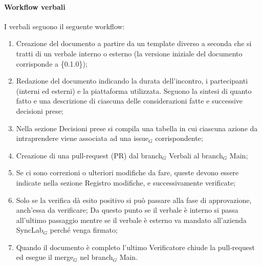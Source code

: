 \documentclass[10pt]{article}
\begin{document}
\begin{justify}
        \paragraph{Workflow verbali}
        I verbali seguono il seguente workflow:
        \begin{enumerate}
            \item Creazione del documento a partire da un template diverso a seconda che si tratti di un verbale interno o esterno (la versione iniziale del documento corrisponde a \{0.1.0\});
            \item Redazione del documento indicando la durata dell'incontro, i partecipanti (interni ed esterni) e la piattaforma utilizzata. Seguono la sintesi di quanto fatto e una descrizione di ciascuna delle considerazioni fatte e successive decisioni prese;
            \item Nella sezione Decisioni prese si compila una
            tabella in cui ciascuna azione da intraprendere viene associata ad una issue$_G$ corrispondente;
            \item Creazione di una pull-request (PR) dal branch$_G$ Verbali al branch$_G$ Main;
            \item Se ci sono correzioni o ulteriori modifiche da fare, queste devono essere indicate nella sezione Registro modifiche, e successivamente verificate;
            \item Solo se la verifica dà esito positivo si può passare alla fase di approvazione, anch'essa da verificare;
            Da questo punto se il verbale è interno si passa all'ultimo passaggio mentre se il verbale è esterno va mandato all'azienda SyncLab$_G$ perché venga firmato;
            \item Quando il documento è completo l'ultimo Verificatore
            chiude la pull-request ed esegue il merge$_G$ nel branch$_G$ Main.
        \end{enumerate}


\end{justify}
\end{document}
